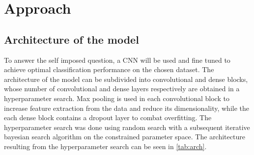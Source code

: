 \section{Approach}
    \label{sec:1}
\subsection{Architecture of the model}
To answer the self imposed question, a CNN will be used and fine tuned to achieve optimal classification performance on the chosen dataset. The architecture of the model can be subdivided into convolutional and dense blocks, whose number of convolutional and dense layers respectively are obtained in a hyperparameter search. Max pooling is used in each convolutional block to increase feature extraction from the data and reduce its dimensionality, while the each dense block contains a dropout layer to combat overfitting. The hyperparameter search was done using random search with a subsequent iterative bayesian search algorithm on the constrained parameter space. The architecture resulting from the hyperparameter search can be seen in \autoref{tab:arch}.
